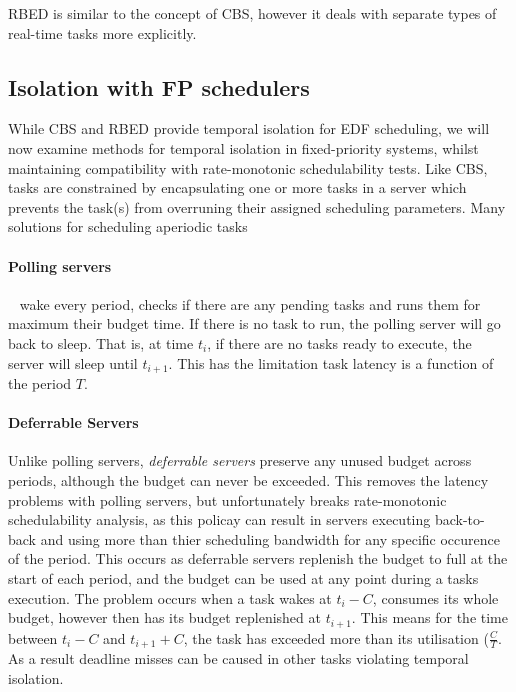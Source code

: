 \Gls{RBED} is similar to the concept of CBS, however it deals with separate types of real-time tasks more explicitly.

\subsection{Isolation with FP schedulers}
\label{background:fp-isolation}

While \gls{CBS} and \gls{RBED} provide temporal isolation for \gls{EDF} scheduling, we will now examine methods for temporal isolation in fixed-priority systems, whilst maintaining compatibility with rate-monotonic schedulability tests.
Like \gls{CBS}, tasks are constrained by encapsulating one or more tasks in a server which prevents the task(s) from overruning their assigned scheduling parameters.
Many solutions for scheduling aperiodic tasks

\paragraph{Polling servers}\label{p:polling-servers}~\citep{Lehoczky_LS_87} wake every period, checks if there are any pending tasks and runs them for maximum their budget time. If there is no task to run, the polling server will go back to sleep. That is, at time $t_{i}$, if there are no tasks ready to execute, the server will sleep until $t_{i+1}$. This has the limitation task latency is a function of the period $T$.

\paragraph{Deferrable Servers} Unlike polling servers, \emph{deferrable servers}\citep{Lehoczky_LS_87, Strosnider_LS_1995} preserve any unused budget across periods, although the budget can never be exceeded.
This removes the latency problems with polling servers, but unfortunately breaks rate-monotonic schedulability analysis, as this policay can result in servers executing back-to-back and using more than thier scheduling bandwidth for any specific occurence of the period.
This occurs as deferrable servers replenish the budget to full at the start of each period, and the budget can be used at any point during a tasks execution.
The problem occurs when a task wakes at $t_{i} - C$, consumes its whole budget, however then has its budget replenished at $t_{i+1}$.
This means for the time between $t_{i} - C$ and $t_{i+1} + C$, the task has exceeded more than its utilisation ($\frac{C}{T}.$
As a result deadline misses can be caused in other tasks violating temporal isolation.

